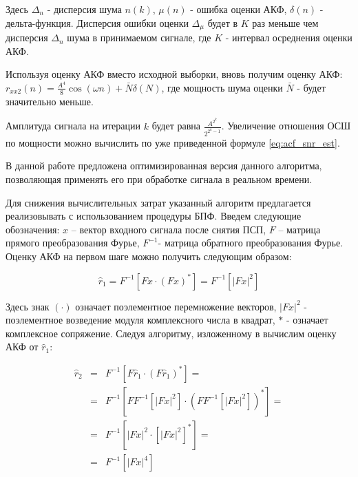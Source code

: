 Здесь ${\Delta_n}$ - дисперсия шума ${n(k)}$, ${\mu{(n)}}$ - ошибка оценки АКФ, ${\delta{(n)}}$ - дельта-функция. Дисперсия ошибки
оценки ${\Delta_{\mu}}$ будет в ${K}$ раз меньше чем дисперсия ${\Delta_n}$ шума в принимаемом сигнале, где ${K}$ - интервал
осреднения оценки АКФ.

Используя оценку АКФ вместо исходной выборки, вновь получим оценку АКФ:
${r_{xx2}(n) = \frac{A^4}{8} \cos{(\omega n)} + \bar{N} \delta{(N)}}$,
где мощность шума оценки ${\bar{N}}$ - будет значительно меньше.

Амплитуда сигнала на итерации ${k}$ будет равна ${\frac{A^{2^k}}{2^{2^k-1}}}$. Увеличение отношения ОСШ по мощности можно
вычислить по уже приведенной формуле \ref{eq:acf_snr_est}. 

В данной работе предложена оптимизированная версия данного алгоритма, позволяющая применять его при обработке сигнала в реальном времени.

Для снижения вычислительных затрат указанный алгоритм предлагается реализовывать с использованием процедуры БПФ. 
Введем следующие обозначения: ${x}$ – вектор входного сигнала после снятия ПСП, ${F}$ – матрица прямого преобразования Фурье, ${F^{-1}}$- матрица обратного преобразования Фурье.
Оценку АКФ на первом шаге можно получить следующим образом:

\begin{center}
\begin{equation}
	\label{eq:akf_1}
	\hat{r}_1 = F^{-1}\left[ Fx \cdot (Fx)^* \right] = F^{-1} \left[ \left| Fx \right| ^2 \right]
\end{equation}
\end{center}

Здесь знак ${(\cdot)}$  означает поэлементное перемножение векторов, ${\left| Fx \right| ^2}$ - поэлементное возведение модуля комплексного числа в квадрат, ${*}$ - означает
комплексное сопряжение.  Следуя алгоритму, изложенному в \cite{ostanin_akf} вычислим оценку АКФ от ${\hat{r}_1}$:

\begin{center}
\begin{eqnarray}
	\label{eq:akf_2}
	\hat{r}_2 & = & F^{-1}\left[ F \hat{r}_1 \cdot (F \hat{r}_1)^* \right] = \nonumber \\
		& = & F^{-1}	\left[ 
				FF^{-1} \left[
						\left| Fx \right| ^2
					\right]
						\cdot \left( FF^{-1} \left[ \left| Fx \right| ^2 \right]
					\right) ^*
			\right] = \nonumber \\
		& = & F^{-1} \left[ \left| Fx \right| ^2 \cdot \left[ \left| Fx \right| ^2 \right] ^* \right] =  \nonumber \\
		& = & F^{-1} \left[ \left| Fx \right| ^4 \right]
\end{eqnarray}
\end{center}


